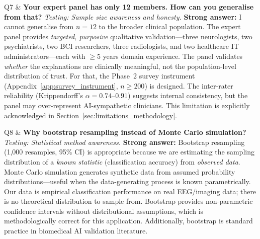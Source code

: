 \begin{xltabular}
Q7 & \textbf{Your expert panel has only 12 members. How can you generalise from that?} \newline
\textit{Testing: Sample size awareness and honesty.} \newline\newline
\textbf{Strong answer:} I cannot generalise from $n = 12$ to the broader clinical population. The expert panel provides \textit{targeted, purposive} qualitative validation---three neurologists, two psychiatrists, two BCI researchers, three radiologists, and two healthcare IT administrators---each with $\geq$5 years domain experience. The panel validates \textit{whether} the explanations are clinically meaningful, not the population-level distribution of trust. For that, the Phase~2 survey instrument (Appendix~\ref{app:survey_instrument}, $n \geq 200$) is designed. The inter-rater reliability (Krippendorff's $\alpha = 0.74$--$0.91$) suggests internal consistency, but the panel may over-represent AI-sympathetic clinicians. This limitation is explicitly acknowledged in Section~\ref{sec:limitations_methodology}. \\
\addlinespace

Q8 & \textbf{Why bootstrap resampling instead of Monte Carlo simulation?} \newline
\textit{Testing: Statistical method awareness.} \newline\newline
\textbf{Strong answer:} Bootstrap resampling (1,000 resamples, 95\% CI) is appropriate because we are estimating the sampling distribution of a \textit{known statistic} (classification accuracy) from \textit{observed data}. Monte Carlo simulation generates synthetic data from assumed probability distributions---useful when the data-generating process is known parametrically. Our data is empirical classification performance on real EEG/imaging data; there is no theoretical distribution to sample from. Bootstrap provides non-parametric confidence intervals without distributional assumptions, which is methodologically correct for this application. Additionally, bootstrap is standard practice in biomedical AI validation literature. \\
\addlinespace


\end{xltabular}
